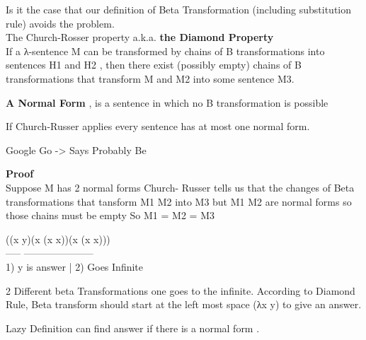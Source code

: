 \documentclass{article}
\begin{document}
Is it the case that our definition of Beta Transformation (including substitution rule) avoids the problem.\\


The Church-Rosser property a.k.a. \textbf{the Diamond Property}\\


If a λ-sentence M can be transformed by chains of B transformations into sentences H1 and H2 , then there exist (possibly empty) chains of B transformations that transform M and M2 into some sentence M3.
\bigskip

\textbf{A Normal Form} , is a  sentence in which no B transformation is possible
\bigskip

If Church-Russer applies every sentence has at most one normal form.
\bigskip

Google Go -> Says Probably Be
\bigskip

\textbf{Proof }\\
Suppose M has 2 normal forms Church- Russer tells us that the changes of Beta transformations that tansform M1 M2 into M3 but M1 M2 are normal forms so those chains must be empty So M1 = M2 = M3

\bigskip
((\lambda x y)(\lambda x (x x))(\lambda x (x x)))\\
 ----- ---------------------\\
1) y is answer | 2) Goes Infinite
\bigskip

\begin{flushleft}

2 Different beta Transformations one goes to the infinite. According to Diamond Rule, Beta transform should start at the left most space (λx y) to give an answer.\\
\end{flushleft}
Lazy Definition  can find answer if there is a normal form .
\end{document}
